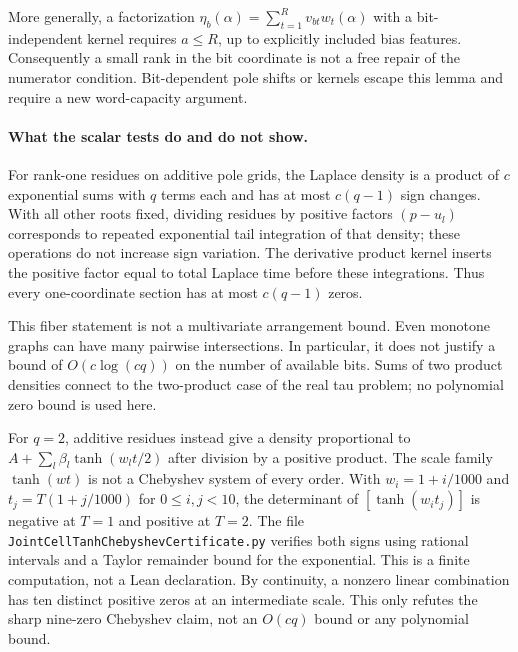 \documentclass{article}
\begin{document}
More generally, a factorization
$\eta_b(\alpha)=\sum_{t=1}^R v_{bt}w_t(\alpha)$ with a bit-independent
kernel requires $a\le R$, up to explicitly included bias features.
Consequently a small rank in the bit coordinate is not a free repair of
the numerator condition. Bit-dependent pole shifts or kernels escape
this lemma and require a new word-capacity argument.

\paragraph{What the scalar tests do and do not show.}
For rank-one residues on additive pole grids, the Laplace density is a
product of $c$ exponential sums with $q$ terms each and has at most
$c(q-1)$ sign changes. With all other roots fixed, dividing residues by
positive factors $(p-u_l)$ corresponds to repeated exponential tail
integration of that density; these operations do not increase sign
variation. The derivative product kernel inserts the positive factor
equal to total Laplace time before these integrations. Thus every
one-coordinate section has at most $c(q-1)$ zeros.

This fiber statement is not a multivariate arrangement bound. Even
monotone graphs can have many pairwise intersections. In particular, it
does not justify a bound of $O(c\log(cq))$ on the number of available
bits. Sums of two product densities connect to the two-product case of
the real tau problem; no polynomial zero bound is used here.

For $q=2$, additive residues instead give a density proportional to
$A+\sum_l\beta_l\tanh(w_lt/2)$ after division by a positive product.
The scale family $\tanh(wt)$ is not a Chebyshev system of every order.
With $w_i=1+i/1000$ and $t_j=T(1+j/1000)$ for $0\le i,j<10$, the
determinant of $[\tanh(w_it_j)]$ is negative at $T=1$ and positive at
$T=2$. The file \texttt{JointCellTanhChebyshevCertificate.py} verifies
both signs using rational intervals and a Taylor remainder bound for the
exponential. This is a finite computation, not a Lean declaration. By
continuity, a nonzero linear combination has ten distinct positive
zeros at an intermediate scale. This only refutes the sharp nine-zero
Chebyshev claim, not an $O(cq)$ bound or any polynomial bound.
\end{document}
